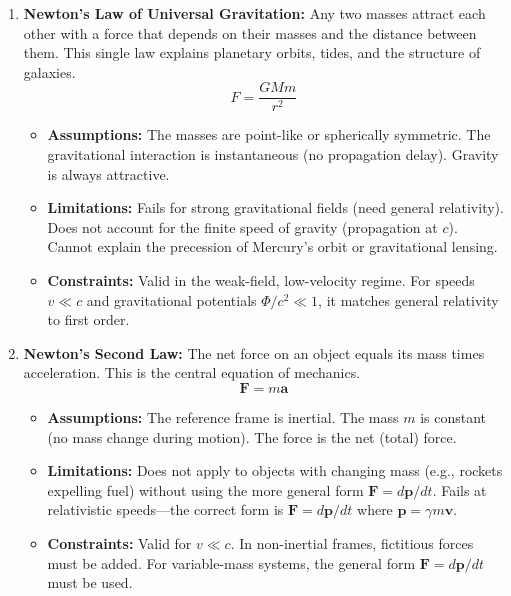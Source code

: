 \begin{enumerate}
\item \textbf{Newton's Law of Universal Gravitation:} Any two masses attract each other with a force that depends on their masses and the distance between them. This single law explains planetary orbits, tides, and the structure of galaxies.
\[
F=\frac{GMm}{r^2}
\]
\begin{itemize}
\item \textbf{Assumptions:} The masses are point-like or spherically symmetric. The gravitational interaction is instantaneous (no propagation delay). Gravity is always attractive.
\item \textbf{Limitations:} Fails for strong gravitational fields (need general relativity). Does not account for the finite speed of gravity (propagation at $c$). Cannot explain the precession of Mercury's orbit or gravitational lensing.
\item \textbf{Constraints:} Valid in the weak-field, low-velocity regime. For speeds $v\ll c$ and gravitational potentials $\Phi/c^2\ll 1$, it matches general relativity to first order.
\end{itemize}

\item \textbf{Newton's Second Law:} The net force on an object equals its mass times acceleration. This is the central equation of mechanics.
\[
\mathbf F=m\mathbf a
\]
\begin{itemize}
\item \textbf{Assumptions:} The reference frame is inertial. The mass $m$ is constant (no mass change during motion). The force is the net (total) force.
\item \textbf{Limitations:} Does not apply to objects with changing mass (e.g., rockets expelling fuel) without using the more general form $\mathbf F=d\mathbf p/dt$. Fails at relativistic speeds---the correct form is $\mathbf F=d\mathbf p/dt$ where $\mathbf p=\gamma m\mathbf v$.
\item \textbf{Constraints:} Valid for $v\ll c$. In non-inertial frames, fictitious forces must be added. For variable-mass systems, the general form $\mathbf F=d\mathbf p/dt$ must be used.
\end{itemize}


\end{enumerate}
